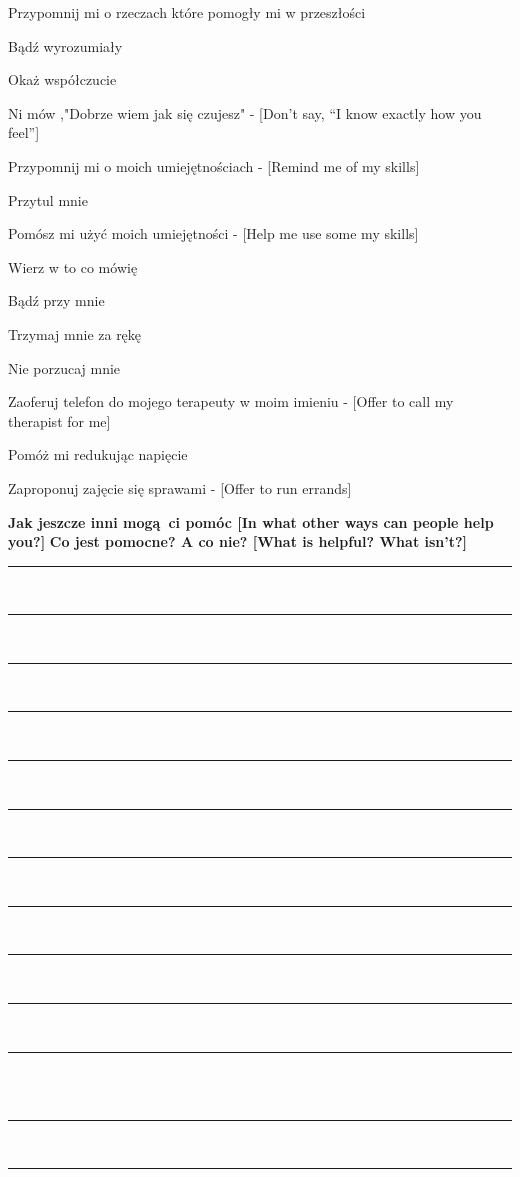 \begin{multicols}{2}
\begin{checkboxlist}
\item Przypomnij mi o rzeczach które pomogły mi w przeszłości
\item Bądź wyrozumiały
\item Okaż współczucie
\item Ni mów ,"Dobrze wiem jak się czujesz" - [Don’t say, “I know exactly how you feel”]
\item Przypomnij mi o moich umiejętnościach - [Remind me of my skills]
\item Przytul mnie
\item Pomósz mi użyć moich umiejętności - [Help me use some my skills]
\item Wierz w to co mówię
\item Bądź przy mnie
\item Trzymaj mnie za rękę
\item Nie porzucaj mnie
\item Zaoferuj telefon do mojego terapeuty w moim imieniu - [Offer to call my therapist for me]
\item Pomóż mi redukując napięcie
\item Zaproponuj zajęcie się sprawami - [Offer to run errands]
\end{checkboxlist}
\end{multicols}
\noindent\textcolor{ProcessBlue}{\textbf{\Large{Jak jeszcze inni mogą ci pomóc [In what other ways can people help you?]}}}
\noindent\textcolor{ProcessBlue}{\textbf{\Large{Co jest pomocne? A co nie? [What is helpful? What isn’t?]}}}\\
\noindent\rule{\textwidth}{1pt}\\
\noindent\rule{\textwidth}{1pt}\\
\noindent\rule{\textwidth}{1pt}\\
\noindent\rule{\textwidth}{1pt}\\
\noindent\rule{\textwidth}{1pt}\\
\noindent\rule{\textwidth}{1pt}\\
\noindent\rule{\textwidth}{1pt}\\
\noindent\rule{\textwidth}{1pt}\\
\noindent\rule{\textwidth}{1pt}\\
\noindent\rule{\textwidth}{1pt}\\
\noindent\rule{\textwidth}{1pt}\\\\
\newpage
\noindent\rule{\textwidth}{1pt}\\
\noindent\rule{\textwidth}{1pt}\\
